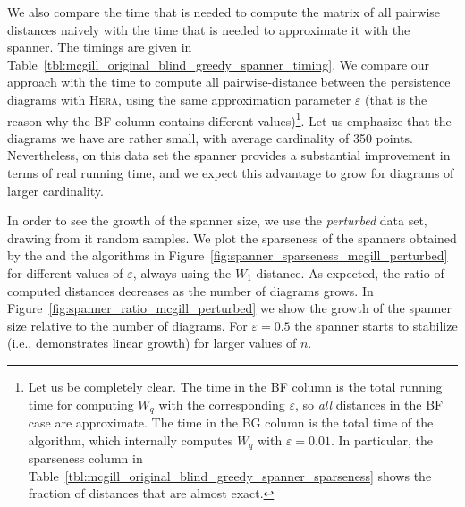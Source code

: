 \documentclass{ws-ijcga}
\newcommand{\eps}{\varepsilon}
\newcommand{\dtype}[1]{{\textit{\small #1}}}
\newcommand{\libraryname}[1]{{\textsc{#1}}\xspace}
\newcommand{\hera}{\libraryname{Hera}}
\newcommand{\wsdist}[1]{{W_{#1}}}
\begin{document}
We also compare the time that is needed to compute the matrix of all pairwise distances
naively with the time that is needed to approximate it with the \bgrdy spanner.
The timings are given in Table~\ref{tbl:mcgill_original_blind_greedy_spanner_timing}.
We compare our approach with the time to compute all pairwise-distance between the
persistence diagrams with \hera, using the same approximation parameter
$\eps$ (that is the reason why the BF column contains different values)\footnote{Let us be completely clear. The time in the BF column is the total running time for computing 
$\wsdist{q}$ with the corresponding $\eps$, so \textit{all} distances in the BF case are approximate. The time in the BG column
is the total time of the \bgrdy algorithm, which internally computes $\wsdist{q}$ with $\eps = 0.01$. In particular,
the sparseness column in Table~\ref{tbl:mcgill_original_blind_greedy_spanner_sparseness} shows the fraction of distances that are almost exact.}.
Let us emphasize that the diagrams we have are rather small,
with average cardinality of
350 points. Nevertheless, on this data set the \bgrdy spanner
provides a substantial improvement in terms of real running time,
and we expect this advantage to grow for diagrams of larger cardinality.



In order to see the growth of the spanner size, we use the \dtype{perturbed}
data set, drawing from it random samples.
We plot the sparseness of the spanners obtained by the \grdy
and the \bgrdy algorithms in Figure~\ref{fig:spanner_sparseness_mcgill_perturbed}
for different values of $\eps$, always using the $\wsdist{1}$ distance.
As expected, the ratio of computed distances decreases as the number of diagrams
grows. In Figure~\ref{fig:spanner_ratio_mcgill_perturbed} we show
the growth of the spanner size relative to the number of diagrams.
For $\eps = 0.5$ the \bgrdy spanner starts to stabilize (i.e., demonstrates
linear growth) for larger values of $n$.
\end{document}
